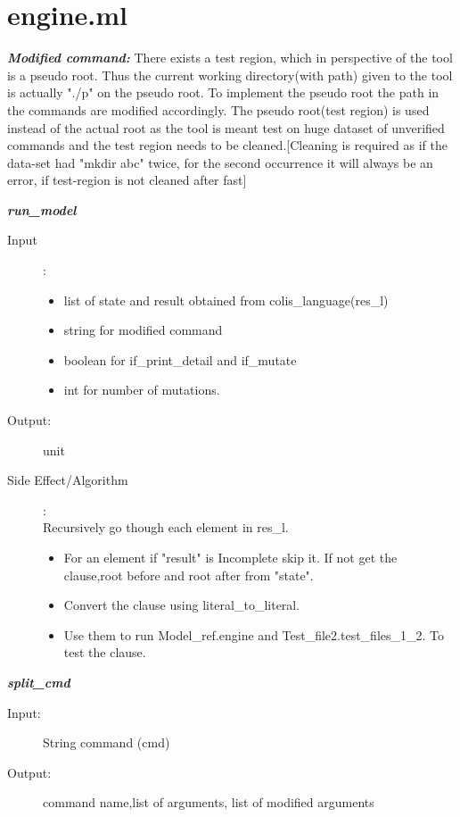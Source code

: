 \documentclass[12pt]{article}
\begin{document}
\section{engine.ml}
\begin{description}

\item \textbf{\textit{Modified command:}} There exists a test region, which in perspective of the tool is a pseudo root. Thus the current working directory(with path) given to the tool is actually "./p" on the pseudo root. To implement the pseudo root the path in the commands are modified accordingly. The pseudo root(test region) is used instead of the actual root as the tool is meant test on huge dataset of unverified commands and the test region needs to be cleaned.[Cleaning is required as if the data-set had "mkdir abc" twice, for the second occurrence it will always be an error, if test-region is not cleaned after fast]

\item \textbf{\textit{run\_model}}
\begin{description}
    \item[Input]:
    \begin{itemize}
        \item list of state and result obtained from colis\_language(res\_l)
        \item string for modified command
        \item boolean for if\_print\_detail and if\_mutate
        \item int for number of mutations.
    \end{itemize}
    \item[Output:] unit
    \item[Side Effect/Algorithm]:\\Recursively go though each element in res\_l.
    \begin{itemize}
        \item For an element if "result" is Incomplete skip it. If not get the clause,root before and root after from "state".
        \item  Convert the clause using literal\_to\_literal.
        \item  Use them to run Model\_ref.engine and Test\_file2.test\_files\_1\_2. To test the clause.
    \end{itemize}
    
\end{description}

\item \textbf{\textit{split\_cmd}}
\begin{description}
    \item[Input:] String command (cmd)
    \item[Output:] command name,list of arguments, list of modified arguments
\end{description}


\end{description}
\end{document}
